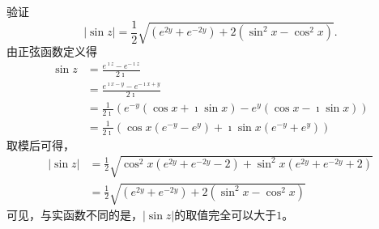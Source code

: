 \begin{examplebox}{验证\begin{equation*}
    |\sin z|=\frac{1}{2} \sqrt{\left(e^{2 y}+e^{-2 y}\right)+2\left(\sin ^2 x-\cos ^2 x\right)} .
    \end{equation*}
    }
    由正弦函数定义得
    \begin{align*}
        \sin z &= \frac{e^{\imath z} - e^{-\imath z}}{2\imath} 
        \\ 
        & = \frac{e^{\imath x - y} - e^{-\imath x + y}}{2\imath}
        \\
        & = \frac{1}{2\imath}\left( e^{-y} (\cos x + \imath \sin x ) - e^{y} (\cos x - \imath \sin x ) \right) 
        \\
        & = \frac{1}{2\imath} \left( \cos x (e^{-y} - e^{y}) + \imath \sin x (e^{-y} + e^{y}) \right)
    \end{align*}
    取模后可得，
    \begin{align*}
        |\sin z | &= \frac{1}{2}\sqrt{ \cos^2x (e^{2y} + e^{-2y} -2) + \sin^2 x (e^{2y} + e^{-2y} +2) }
        \\
        &=\frac{1}{2}\sqrt{\left(e^{2 y}+e^{-2 y}\right)+2\left(\sin ^2 x-\cos ^2 x\right)}
    \end{align*}
    可见，与实函数不同的是，$|\sin z|$的取值完全可以大于$1$。
\end{examplebox}


